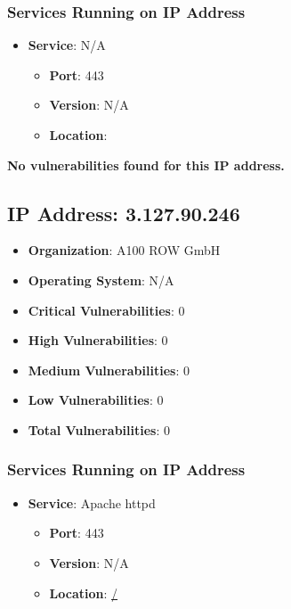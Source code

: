 \documentclass{article}
\begin{document}
\subsubsection*{Services Running on IP Address}

\begin{itemize}
    
        \item \textbf{Service}: N/A
        \begin{itemize}
            \item \textbf{Port}: 443
            \item \textbf{Version}:  N/A 
            \item \textbf{Location}: \href{  }{  }
        \end{itemize}
    
\end{itemize}


\textbf{No vulnerabilities found for this IP address.}




\clearpage



\subsection*{IP Address: 3.127.90.246}

\begin{itemize}
    \item \textbf{Organization}: A100 ROW GmbH
    \item \textbf{Operating System}:  N/A 
    \item \textbf{Critical Vulnerabilities}: 0
    \item \textbf{High Vulnerabilities}: 0
    \item \textbf{Medium Vulnerabilities}: 0
    \item \textbf{Low Vulnerabilities}: 0
    \item \textbf{Total Vulnerabilities}: 0
\end{itemize}

\subsubsection*{Services Running on IP Address}

\begin{itemize}
    
        \item \textbf{Service}: Apache httpd
        \begin{itemize}
            \item \textbf{Port}: 443
            \item \textbf{Version}:  N/A 
            \item \textbf{Location}: \href{ / }{ / }
        \end{itemize}
    
\end{itemize}
\end{document}
